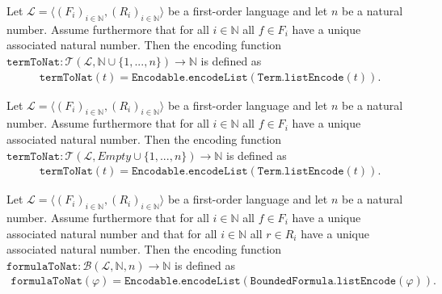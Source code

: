 \begin{definition}\label{def:FV-Term-Enc}
  \leanok
    Let $\mathcal{L} = \langle (F_i)_{i \in \mathbb{N}}, (R_i)_{i \in \mathbb{N}} \rangle$ be a first-order language and let $n$ be a natural number. Assume furthermore that for all $i \in \mathbb{N}$ all $f \in F_i$ have a unique associated natural number. Then the encoding function $\texttt{termToNat} : \mathcal{T}(\mathcal{L},\mathbb{N} \cup \{1,...,n\}) \to \mathbb{N}$ is defined as 
    \begin{align*}  
        \texttt{termToNat}(t) = \texttt{Encodable.encodeList}(\texttt{Term.listEncode}(t)).
    \end{align*}
\end{definition}

\begin{definition}\label{def:S-Term-Enc}
  \leanok
    Let $\mathcal{L} = \langle (F_i)_{i \in \mathbb{N}}, (R_i)_{i \in \mathbb{N}} \rangle$ be a first-order language and let $n$ be a natural number. Assume furthermore that for all $i \in \mathbb{N}$ all $f \in F_i$ have a unique associated natural number. Then the encoding function $\texttt{termToNat} : \mathcal{T}(\mathcal{L},Empty \cup \{1,...,n\}) \to \mathbb{N}$ is defined as 
    \begin{align*}  
        \texttt{termToNat}(t) = \texttt{Encodable.encodeList}(\texttt{Term.listEncode}(t)).
    \end{align*}
\end{definition}

\begin{definition}\label{def:FV-Formula-to-N}
  \leanok
    Let $\mathcal{L} = \langle (F_i)_{i \in \mathbb{N}}, (R_i)_{i \in \mathbb{N}} \rangle$ be a first-order language and let $n$ be a natural number. Assume furthermore that for all $i \in \mathbb{N}$ all $f \in F_i$ have a unique associated natural number and that for all $i \in \mathbb{N}$ all $r \in R_i$ have a unique associated natural number. Then the encoding function $\texttt{formulaToNat} : \mathcal{B}(\mathcal{L},\mathbb{N},n) \to \mathbb{N}$ is defined as 
    \begin{align*}
        \texttt{formulaToNat}(\varphi) = \texttt{Encodable.encodeList}(\texttt{BoundedFormula.listEncode}(\varphi)).
    \end{align*}
\end{definition}

